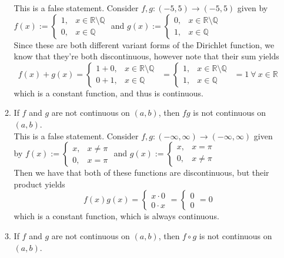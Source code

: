 \documentclass[12pt,letterpaper]{article}
\newcommand{\R}{\mathbb{R}}
\newcommand{\Q}{\mathbb{Q}}
\theoremstyle{case}
\theoremstyle{definition}
\begin{document}
\begin{enumerate}
\begin{enumerate}
				This is a false statement. Consider $f,g:(-5,5) \to (-5,5)$ given by $f(x):=\begin{cases}
					1, & x \in \R \setminus \Q \\
					0, & x \in \Q
				\end{cases}$    and    $g(x):=\begin{cases}
					0, & x \in \R \setminus \Q \\
					1, & x \in \Q
				\end{cases}$\\
				Since these are both different variant forms of the Dirichlet function, we know that they're both discontinuous, however note that their sum yields
				\[f(x)+g(x)=\begin{cases}
					1+0, & x \in \R \setminus \Q \\
					0+1, & x \in \Q
				\end{cases}\ \ =\begin{cases}
					1, & x \in \R \setminus \Q \\
					1, & x \in \Q
				\end{cases}\ \ = 1\ \forall\ x \in \R\]
				which is a constant function, and thus is continuous.\\
				\item If $f$ and $g$ are not continuous on $(a,b)$, then $fg$ is not continuous on $(a,b)$.\\
				
				This is a false statement. Consider $f,g:(-\infty,\infty) \to (-\infty,\infty)$ given by $f(x):=\begin{cases}
					x, & x \neq \pi \\
					0, & x = \pi
				\end{cases}$ and $g(x):=\begin{cases}
					x, & x = \pi \\
					0, & x \neq \pi
				\end{cases}$\\
				Then we have that both of these functions are discontinuous, but their product yields
				\[f(x)g(x)=\begin{cases}
					x \cdot 0 \\
					0 \cdot x
				\end{cases} = \begin{cases}
					0 \\
					0
				\end{cases} = 0\]
				which is a constant function, which is always continuous.\\
				\item If $f$ and $g$ are not continuous on $(a,b)$, then $f \circ g$ is not continuous on $(a,b)$.\\
				

\end{enumerate}
\end{enumerate}
\end{document}
